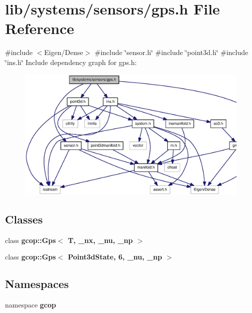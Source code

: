 \section{lib/systems/sensors/gps.h \-File \-Reference}
\label{gps_8h}
{\ttfamily \#include $<$\-Eigen/\-Dense$>$}\*
{\ttfamily \#include \char`\"{}sensor.\-h\char`\"{}}\*
{\ttfamily \#include \char`\"{}point3d.\-h\char`\"{}}\*
{\ttfamily \#include \char`\"{}ins.\-h\char`\"{}}\*
\-Include dependency graph for gps.\-h\-:\nopagebreak
\begin{figure}[H]
\begin{center}
\leavevmode
\includegraphics[width=350pt]{gps_8h__incl}
\end{center}
\end{figure}
\subsection*{\-Classes}
\begin{DoxyCompactItemize}
\item 
class {\bf gcop\-::\-Gps$<$ T, \-\_\-nx, \-\_\-nu, \-\_\-np $>$}
\item 
class {\bf gcop\-::\-Gps$<$ Point3d\-State, 6, \-\_\-nu, \-\_\-np $>$}
\end{DoxyCompactItemize}
\subsection*{\-Namespaces}
\begin{DoxyCompactItemize}
\item 
namespace {\bf gcop}
\end{DoxyCompactItemize}
